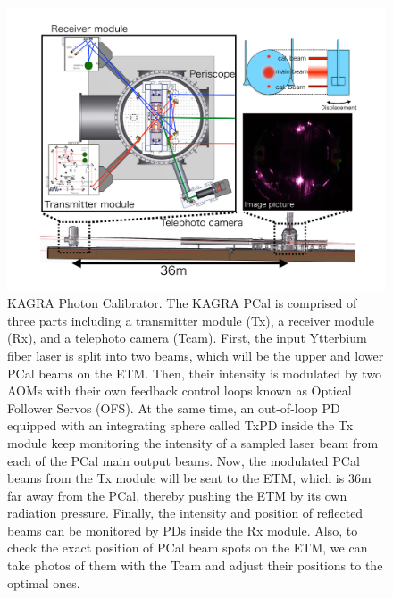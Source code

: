 \begin{figure}[hbt!]
\centering
\includegraphics[width=1\textwidth]{figure/pcal/pcal_drawing.pdf}
\caption[KAGRA Photon Calibrator]{KAGRA Photon Calibrator. The KAGRA PCal is comprised of three parts including a transmitter module (Tx), a receiver module (Rx), and a telephoto camera (Tcam). First, the input Ytterbium fiber laser is split into two beams, which will be the upper and lower PCal beams on the ETM. Then, their intensity is modulated by two AOMs with their own feedback control loops known as Optical Follower Servos (OFS). At the same time, an out-of-loop PD equipped with an integrating sphere called TxPD inside the Tx module keep monitoring the intensity of a sampled laser beam from each of the PCal main output beams. Now, the modulated PCal beams from the Tx module will be sent to the ETM, which is 36m far away from the PCal, thereby pushing the ETM by its own radiation pressure. Finally, the intensity and position of reflected beams can be monitored by PDs inside the Rx module. Also, to check the exact position of PCal beam spots on the ETM, we can take photos of them with the Tcam and adjust their positions to  the optimal ones.}
\label{fig:pcal_drawing}
\end{figure}
 

%

